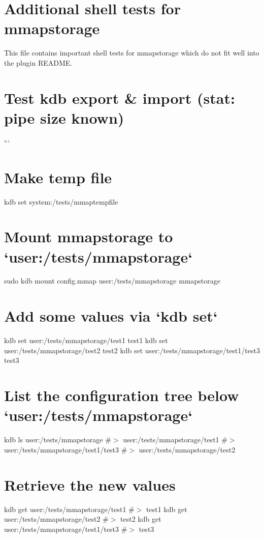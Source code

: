 \hypertarget{autotoc_md417_src_plugins_mmapstorage_shelltests_md}{}\section{Additional shell tests for mmapstorage}\label{autotoc_md417_src_plugins_mmapstorage_shelltests_md}
This file contains important shell tests for mmapstorage which do not fit well into the plugin R\+E\+A\+D\+ME.\hypertarget{autotoc_md417_autotoc_md418}{}\section{Test kdb export \& import (stat\+: pipe size known)}\label{autotoc_md417_autotoc_md418}
``` \hypertarget{autotoc_md417_autotoc_md419}{}\section{Make temp file}\label{autotoc_md417_autotoc_md419}
kdb set system\+:/tests/mmaptempfile \hypertarget{autotoc_md417_autotoc_md420}{}\section{Mount mmapstorage to `user\+:/tests/mmapstorage`}\label{autotoc_md417_autotoc_md420}
sudo kdb mount config.\+mmap user\+:/tests/mmapstorage mmapstorage\hypertarget{autotoc_md417_autotoc_md421}{}\section{Add some values via `kdb set`}\label{autotoc_md417_autotoc_md421}
kdb set user\+:/tests/mmapstorage/test1 test1 kdb set user\+:/tests/mmapstorage/test2 test2 kdb set user\+:/tests/mmapstorage/test1/test3 test3\hypertarget{autotoc_md417_autotoc_md422}{}\section{List the configuration tree below `user\+:/tests/mmapstorage`}\label{autotoc_md417_autotoc_md422}
kdb ls user\+:/tests/mmapstorage \#$>$ user\+:/tests/mmapstorage/test1 \#$>$ user\+:/tests/mmapstorage/test1/test3 \#$>$ user\+:/tests/mmapstorage/test2\hypertarget{autotoc_md417_autotoc_md423}{}\section{Retrieve the new values}\label{autotoc_md417_autotoc_md423}
kdb get user\+:/tests/mmapstorage/test1 \#$>$ test1 kdb get user\+:/tests/mmapstorage/test2 \#$>$ test2 kdb get user\+:/tests/mmapstorage/test1/test3 \#$>$ test3

